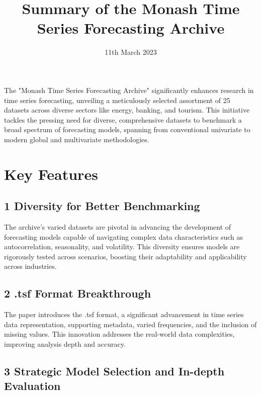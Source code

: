 \documentclass{article}
\title{Summary of the Monash Time Series Forecasting Archive}
\date{11th March 2023}
\begin{document}
\maketitle

\noindent\makebox[\linewidth]{\rule{\textwidth}{1pt}}

The "Monash Time Series Forecasting Archive" significantly enhances research in time series forecasting, unveiling a meticulously selected assortment of 25 datasets across diverse sectors like energy, banking, and tourism. This initiative tackles the pressing need for diverse, comprehensive datasets to benchmark a broad spectrum of forecasting models, spanning from conventional univariate to modern global and multivariate methodologies.

\noindent\makebox[\linewidth]{\rule{\textwidth}{0.4pt}}

\section*{Key Features}

\noindent\makebox[\linewidth]{\rule{\textwidth}{1pt}} 

\subsection*{1 Diversity for Better Benchmarking}

The archive's varied datasets are pivotal in advancing the development of forecasting models capable of navigating complex data characteristics such as autocorrelation, seasonality, and volatility. This diversity ensures models are rigorously tested across scenarios, boosting their adaptability and applicability across industries.

\subsection*{2 .tsf Format Breakthrough}

The paper introduces the .tsf format, a significant advancement in time series data representation, supporting metadata, varied frequencies, and the inclusion of missing values. This innovation addresses the real-world data complexities, improving analysis depth and accuracy.

\subsection*{3 Strategic Model Selection and In-depth Evaluation}
\end{document}
